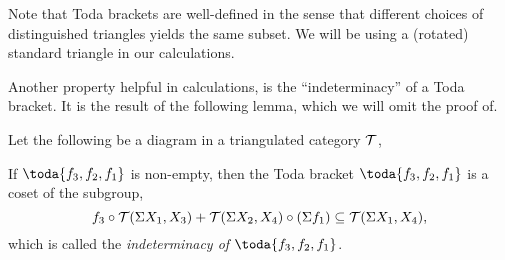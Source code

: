 Note that Toda brackets are well-defined in the sense that different choices of distinguished triangles yields the same subset. We will be using a (rotated) standard triangle in our calculations.

Another property helpful in calculations, is the ``indeterminacy'' of a Toda bracket. It is the result of the following lemma, which we will omit the proof of.
\begin{lemma}
    \label{lem:indeterminacy}
    Let the following be a diagram in a triangulated category \( {\mathcal{T}} \),
    \begin{center}
    \end{center}

    If \( \toda{f_3, f_2, f_1} \) is non-empty, then the Toda bracket \( \toda{f_3, f_2, f_1} \) is a coset of the subgroup,
    \[
        f_3 \circ {\mathcal{T}}(\Sigma X_1, X_3)  + {\mathcal{T}}(\Sigma X_2, X_4) \circ (\Sigma f_1) \subseteq {\mathcal{T}}(\Sigma X_1, X_4),
    \]
    which is called the \emph{indeterminacy of \( \toda{f_3, f_2, f_1} \)}.
\end{lemma}